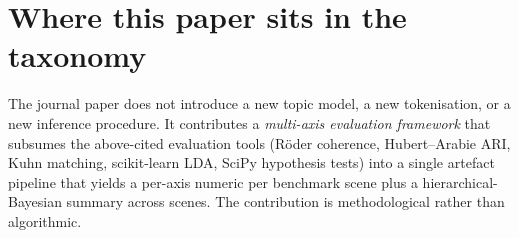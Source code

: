 \documentclass[11pt,a4paper]{article}
\begin{document}
\section{Where this paper sits in the taxonomy}

The journal paper does not introduce a new topic model, a new
tokenisation, or a new inference procedure. It contributes a
\emph{multi-axis evaluation framework} that subsumes the
above-cited evaluation tools (Röder coherence, Hubert--Arabie ARI,
Kuhn matching, scikit-learn LDA, SciPy hypothesis tests) into a
single artefact pipeline that yields a per-axis numeric per
benchmark scene plus a hierarchical-Bayesian summary across scenes.
The contribution is methodological rather than algorithmic.



\end{document}
